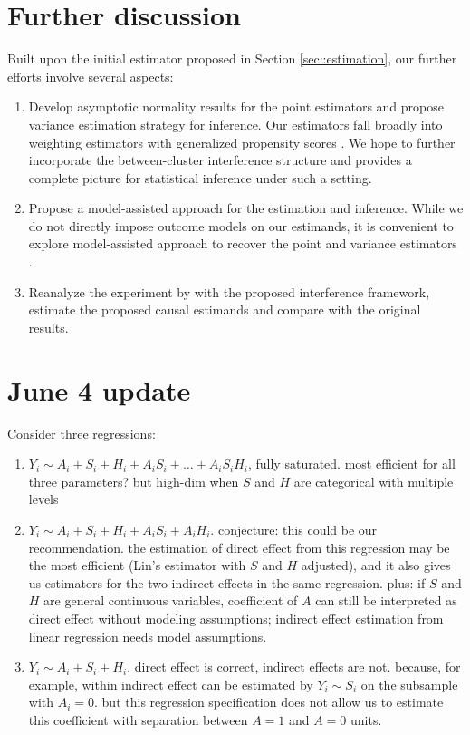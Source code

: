 \documentclass{article}
\begin{document}
\section{Further discussion}     
Built upon the initial estimator proposed in Section \ref{sec::estimation}, our further efforts involve several aspects: 
\begin{enumerate}
    \item Develop asymptotic normality results for the point estimators and propose variance estimation strategy for inference. Our estimators fall broadly into weighting estimators with generalized propensity scores \citep{imbens2000role, aronow2017estimating}. We hope to further incorporate the between-cluster interference structure and provides a complete picture for statistical inference under such a setting. 

    \item Propose a model-assisted approach for the estimation and inference. While we do not directly impose outcome models on our estimands, it is convenient to explore model-assisted approach to recover the point and variance estimators \citep{zhao2022reconciling}. 

    \item Reanalyze the experiment by \cite{egger2022general} with the proposed interference framework, estimate the proposed causal estimands and compare with the original results. 
\end{enumerate}

\section{June 4 update}
Consider three regressions:
\begin{enumerate}
    \item $Y_i \sim A_i + S_i + H_i + A_iS_i + \ldots + A_i S_i H_i$, fully saturated. most efficient for all three parameters? but high-dim when $S$ and $H$ are categorical with multiple levels
    \item $Y_i \sim A_i + S_i + H_i + A_iS_i + A_i H_i $. conjecture: this could be our recommendation. the estimation of direct effect from this regression may be the most efficient (Lin's estimator with $S$ and $H$ adjusted), and it also gives us estimators for the two indirect effects in the same regression. plus: if $S$ and $H$ are general continuous variables, coefficient of $A$ can still be interpreted as direct effect without modeling assumptions; indirect effect estimation from linear regression needs model assumptions.
    \item $Y_i \sim A_i + S_i + H_i$. direct effect is correct, indirect effects are not. because, for example, within indirect effect can be estimated by $Y_i\sim S_i$ on the subsample with $A_i=0$. but this regression specification does not allow us to estimate this coefficient with separation between $A=1$ and $A=0$ units.
\end{enumerate}
\end{document}
